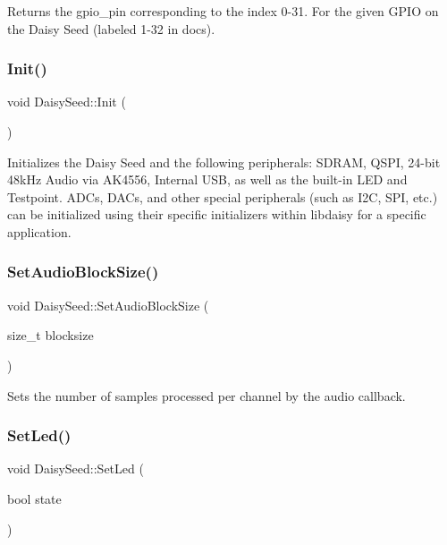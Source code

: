 \begin{DoxyCompactItemize}
Returns the gpio\+\_\+pin corresponding to the index 0-\/31. For the given G\+P\+IO on the Daisy Seed (labeled 1-\/32 in docs). \mbox{\label{classdaisy_1_1_daisy_seed_a149a4167646d3df67a77892b92e46b65}} 
\subsubsection{\texorpdfstring{Init()}{Init()}}
{\footnotesize\ttfamily void Daisy\+Seed\+::\+Init (\begin{DoxyParamCaption}{ }\end{DoxyParamCaption})}

Initializes the Daisy Seed and the following peripherals\+: S\+D\+R\+AM, Q\+S\+PI, 24-\/bit 48k\+Hz Audio via A\+K4556, Internal U\+SB, as well as the built-\/in L\+ED and Testpoint. A\+D\+Cs, D\+A\+Cs, and other special peripherals (such as I2C, S\+PI, etc.) can be initialized using their specific initializers within libdaisy for a specific application. \mbox{\label{classdaisy_1_1_daisy_seed_ac76ed0bcf210d9959f468cee59fdb005}} 
\subsubsection{\texorpdfstring{Set\+Audio\+Block\+Size()}{SetAudioBlockSize()}}
{\footnotesize\ttfamily void Daisy\+Seed\+::\+Set\+Audio\+Block\+Size (\begin{DoxyParamCaption}\item[{size\+\_\+t}]{blocksize }\end{DoxyParamCaption})}

Sets the number of samples processed per channel by the audio callback. \mbox{\label{classdaisy_1_1_daisy_seed_a373f3af918b533daa37c3f5205c309c2}} 
\subsubsection{\texorpdfstring{Set\+Led()}{SetLed()}}
{\footnotesize\ttfamily void Daisy\+Seed\+::\+Set\+Led (\begin{DoxyParamCaption}\item[{bool}]{state }\end{DoxyParamCaption})}


\end{DoxyCompactItemize}
